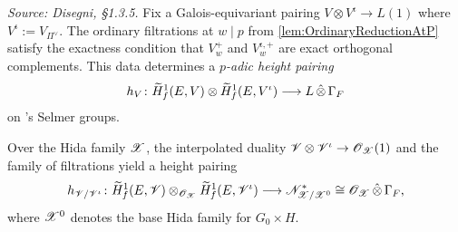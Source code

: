 \begin{definition}
  \label{def:HeightPairing}
  \textit{Source: Disegni, §1.3.5.}
  Fix a Galois-equivariant pairing $V \otimes V^\iota \to L(1)$ where
  $V^\iota := V_{\Pi^\vee}$.  The ordinary filtrations at $w \mid p$
  from \cref{lem:OrdinaryReductionAtP} satisfy the exactness condition
  that $V_w^+$ and $V^{\iota,+}_w$ are exact orthogonal complements.
  This data determines a \emph{$p$-adic height pairing}
  \[
    h_V \colon \widetilde{H}^1_f(E,V) \otimes \widetilde{H}^1_f(E,V^\iota)
    \longrightarrow L \,\hat\otimes\, \Gamma_F
  \]
  on \nek's Selmer groups.

  Over the Hida family $\mathscr{X}$, the interpolated duality
  $\mathscr{V} \otimes \mathscr{V}^\iota \to \mathscr{O}_{\mathscr{X}}(1)$ and the family of filtrations
  yield a height pairing
  \[
    h_{\mathscr{V}/\mathscr{V}^\iota} \colon
    \widetilde{H}^1_f(E,\mathscr{V}) \otimes_{\mathscr{O}_{\mathscr{X}}} \widetilde{H}^1_f(E,\mathscr{V}^\iota)
    \longrightarrow \mathscr{N}^*_{\mathscr{X}/\mathscr{X}^0}
    \cong \mathscr{O}_{\mathscr{X}} \,\hat\otimes\, \Gamma_F,
  \]
  where $\mathscr{X}^0$ denotes the base Hida family for $G_0 \times H$.
\end{definition}

